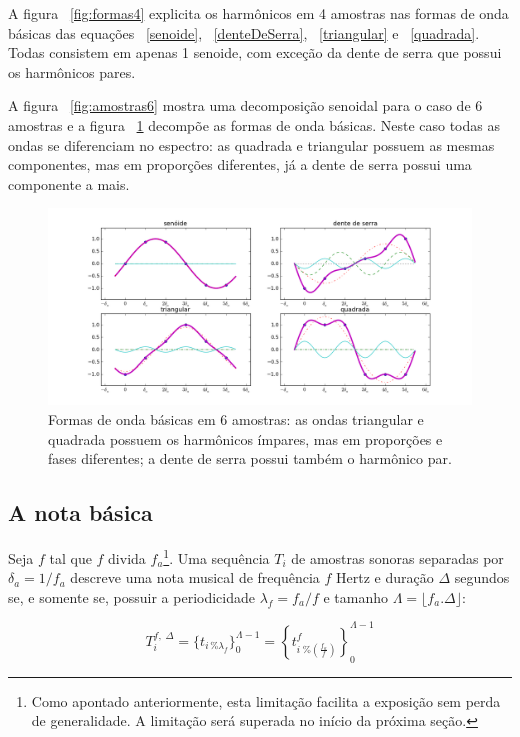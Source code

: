 A figura ~\ref{fig:formas4} explicita os harmônicos em 4 amostras nas formas de onda básicas das equações ~\ref{senoide}, ~\ref{denteDeSerra}, ~\ref{triangular} e ~\ref{quadrada}. Todas consistem em apenas 1 senoide, com exceção da dente de serra que possui os harmônicos pares.


A figura ~\ref{fig:amostras6} mostra uma decomposição senoidal para o caso de 6 amostras e a figura ~\ref{fig:formas6} decompõe as formas de onda básicas.
 Neste caso todas as ondas se diferenciam no espectro: as quadrada e triangular possuem as mesmas componentes, mas em proporções diferentes, já a dente de serra possui uma componente a mais.

\begin{figure}[h!]
    \centering
        \includegraphics[width=\textwidth]{figuras/amostras6formas___}
    \caption{Formas de onda básicas em 6 amostras: as ondas triangular e quadrada possuem os harmônicos ímpares, mas em proporções e fases diferentes; a dente de serra possui também o harmônico par.}
        \label{fig:formas6}
\end{figure}



\subsection{A nota básica}\label{notaBasica}

Seja $f$ tal que $f$ divida $f_a$\footnote{Como apontado anteriormente, esta limitação facilita a exposição sem perda de generalidade.
A limitação será superada no início da próxima seção.}.
Uma sequência $T_i$ de amostras sonoras separadas por $\delta_a=1/f_a$ descreve uma nota musical de frequência $f$ Hertz e duração $\Delta$ segundos se, e somente se, possuir a periodicidade $\lambda_f=f_a/f$
 e tamanho $\Lambda=\lfloor f_a . \Delta \rfloor $:

\begin{equation}\label{eq:notaBasica}
T_i^{f,\; \Delta}=\{t_{i \, \% \lambda_f} \}_0^{\Lambda-1}= \left \{t^f_{i \; \% \left( \frac{f_a}{f} \right) } \right \}_0^{\Lambda-1}
\end{equation}

